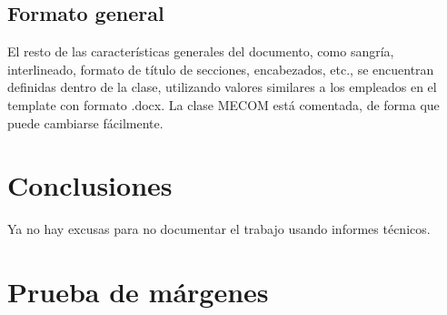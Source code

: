 \documentclass[a4paper,11pt,twoside]{MECOM}
\begin{document}
    
    
    \subsection{Formato general}
    El resto de las caracter\'isticas generales del documento, como sangr\'ia, interlineado, formato de t\'itulo de secciones, encabezados, etc., se encuentran definidas dentro de la clase, utilizando valores similares a los empleados en el template con formato .docx. La clase MECOM est\'a comentada, de forma que puede cambiarse f\'acilmente.
    
    
    
    
    \section{Conclusiones}
    Ya no hay excusas para no documentar el trabajo usando informes t\'ecnicos.\\    
    
    
    
    
    
    
    \newpage
    \section{Prueba de m\'argenes} \blindtext[11]    
\end{document}
